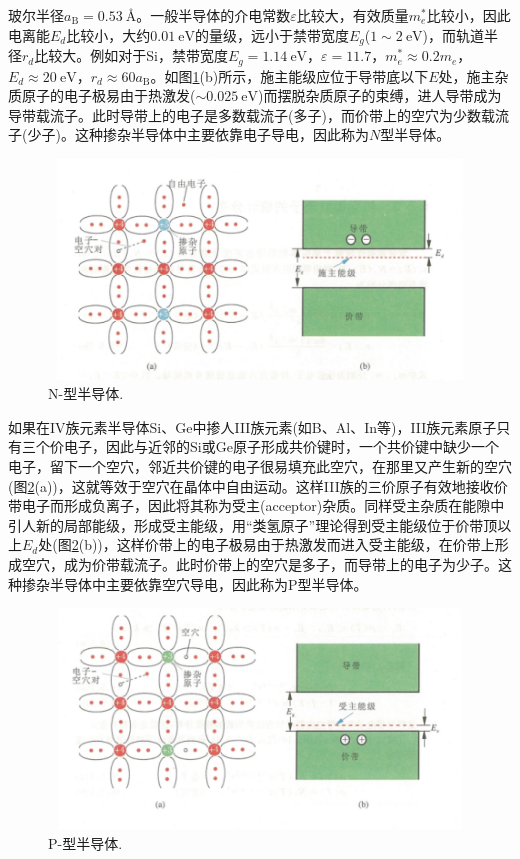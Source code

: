 玻尔半径$a_{\mathrm{B}}=0.53~\mbox{\AA}$。一般半导体的介电常数$\varepsilon$比较大，有效质量$m_e^{\ast}$比较小，因此电离能$E_d$比较小，大约$0.01~\mathrm{eV}$的量级，远小于禁带宽度$E_g$($1\sim2~\mathrm{eV}$)，而轨道半径$r_d$比较大。例如对于Si，禁带宽度$E_g=1.14~\mathrm{eV}$，$\varepsilon=11.7$，$m_e^{\ast}\approx0.2m_e$，$E_d\approx20~\mathrm{eV}$，$r_d\approx60a_{\mathrm{B}}$。如图\ref{Fig:N-conductor}(b)所示，施主能级应位于导带底以下$E$处，施主杂质原子的电子极易由于热激发($\sim0.025~\mathrm{eV}$)而摆脱杂质原子的束缚，进人导带成为导带载流子。此时导带上的电子是多数载流子(多子)，而价带上的空穴为少数载流子(少子)。这种掺杂半导体中主要依靠电子导电，因此称为$N$型半导体。 \begin{figure}[h!]
\centering
\vspace*{-0.10in}
\includegraphics[height=2.30in,width=4.70in,viewport=0 0 105 55,clip]{Figures/N-semi_conductor.png}
\caption{\small \textrm{N-型半导体.}}%
\label{Fig:N-conductor}
\end{figure}

如果在IV族元素半导体Si、Ge中掺人III族元素(如B、Al、In等)，III族元素原子只有三个价电子，因此与近邻的Si或Ge原子形成共价键时，一个共价键中缺少一个电子，留下一个空穴，邻近共价键的电子很易填充此空穴，在那里又产生新的空穴(图\ref{Fig:P-conductor}(a))，这就等效于空穴在晶体中自由运动。这样III族的三价原子有效地接收价带电子而形成负离子，因此将其称为受主(acceptor)杂质。同样受主杂质在能隙中引人新的局部能级，形成受主能级，用``类氢原子''理论得到受主能级位于价带顶以上$E_d$处(图\ref{Fig:P-conductor}(b))，这样价带上的电子极易由于热激发而进入受主能级，在价带上形成空穴，成为价带载流子。此时价带上的空穴是多子，而导带上的电子为少子。这种掺杂半导体中主要依靠空穴导电，因此称为P型半导体。
\begin{figure}[h!]
\centering
\vspace*{-0.10in}
\includegraphics[height=2.30in,width=4.70in,viewport=0 0 105 60,clip]{Figures/P-semi_conductor.png}
\caption{\small \textrm{P-型半导体.}}%
\label{Fig:P-conductor}
\end{figure}


